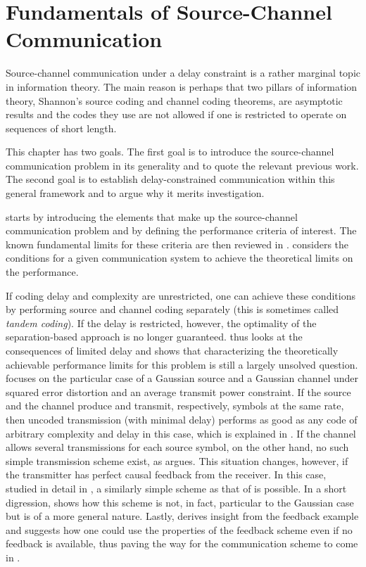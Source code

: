 \chapter{Fundamentals of Source-Channel Communication}\label{ch:fundamentals}

Source-channel communication under a delay constraint is a rather marginal topic
in information theory. The main reason is perhaps that two pillars of
information theory, Shannon's source coding and channel coding theorems, are
asymptotic results and the codes they use are not allowed if one is restricted
to operate on sequences of short length. 

This chapter has two goals. The first goal is to introduce the source-channel
communication problem in its generality and to quote the relevant previous work.
The second goal is to establish delay-constrained communication within this
general framework and to argue why it merits investigation. 

 starts by introducing the elements that make up the
source-channel communication problem and by defining the performance criteria of
interest. The known fundamental limits for these criteria are then reviewed in
.   considers the
conditions for a given communication system to achieve the theoretical limits on
the performance. 

If coding delay and complexity are unrestricted, one can achieve these
conditions by performing source and channel coding separately (this is sometimes
called \emph{tandem coding}). If the delay is restricted, however, the
optimality of the separation-based approach is no longer guaranteed.
 thus looks at the consequences of limited delay and
shows that characterizing the theoretically achievable performance limits for
this problem is still a largely unsolved question.   focuses on
the particular case of a Gaussian source and a Gaussian channel under squared
error distortion and an average transmit power constraint.  If the source and
the channel produce and transmit, respectively, symbols at the same rate, then
uncoded transmission (with minimal delay) performs as good as any code of
arbitrary complexity and delay in this case, which is explained in
. If the channel allows several transmissions for each
source symbol, on the other hand, no such simple transmission scheme exist, as
 argues. This situation changes, however, if the transmitter
has perfect causal feedback from the receiver. In this case, studied in detail
in , a similarly simple scheme as that of
 is possible. In a short digression, 
shows how this scheme is not, in fact, particular to the Gaussian case but is of
a more general nature. Lastly,  derives insight from
the feedback example and suggests how one could use the properties of the
feedback scheme even if no feedback is available, thus paving the way for the
communication scheme to come in . 


